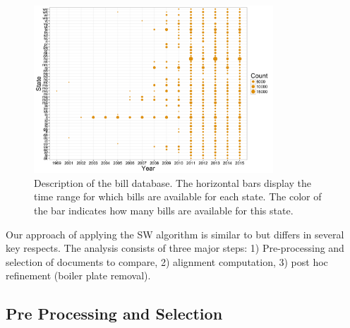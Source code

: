 \documentclass[12pt]{article} %
\begin{document}
\begin{figure}[ht!]
    \centering
    \includegraphics[width=0.8\textwidth]{figures/year_count_by_state.png}
    \caption{Description of the bill database. The horizontal bars display the time range for which bills are available for each state. The color of the bar indicates how many bills are available for this state.}
    \label{fig:bill_desc}
\end{figure}

Our approach of applying the SW algorithm is similar to
\citet{wilkerson2015tracing} but differs in several key respects. The analysis
consists of three major steps: 1) Pre-processing and selection of documents to compare, 2) alignment computation, 3) post hoc refinement (boiler plate removal). 




\subsection{Pre Processing and Selection}
\end{document}
